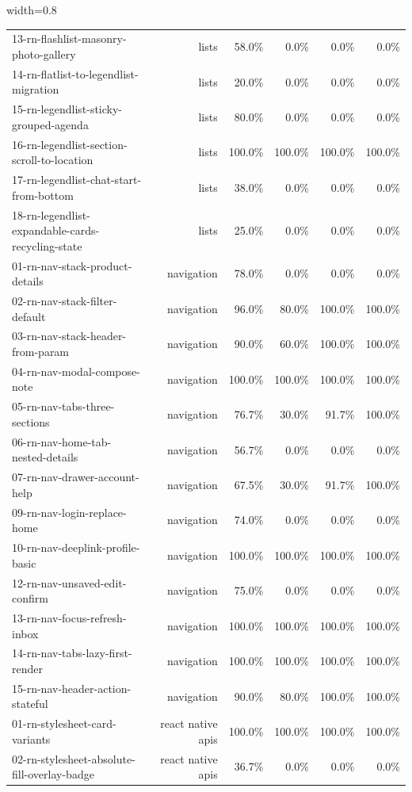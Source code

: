 \begin{table}[htbp]
\begin{adjustbox}{width=0.8\textwidth}
\begin{tabular}{lrrrrr}
13-rn-flashlist-masonry-photo-gallery & lists & 58.0\% & 0.0\% & 0.0\% & 0.0\% \\
14-rn-flatlist-to-legendlist-migration & lists & 20.0\% & 0.0\% & 0.0\% & 0.0\% \\
15-rn-legendlist-sticky-grouped-agenda & lists & 80.0\% & 0.0\% & 0.0\% & 0.0\% \\
16-rn-legendlist-section-scroll-to-location & lists & 100.0\% & 100.0\% & 100.0\% & 100.0\% \\
17-rn-legendlist-chat-start-from-bottom & lists & 38.0\% & 0.0\% & 0.0\% & 0.0\% \\
18-rn-legendlist-expandable-cards-recycling-state & lists & 25.0\% & 0.0\% & 0.0\% & 0.0\% \\
01-rn-nav-stack-product-details & navigation & 78.0\% & 0.0\% & 0.0\% & 0.0\% \\
02-rn-nav-stack-filter-default & navigation & 96.0\% & 80.0\% & 100.0\% & 100.0\% \\
03-rn-nav-stack-header-from-param & navigation & 90.0\% & 60.0\% & 100.0\% & 100.0\% \\
04-rn-nav-modal-compose-note & navigation & 100.0\% & 100.0\% & 100.0\% & 100.0\% \\
05-rn-nav-tabs-three-sections & navigation & 76.7\% & 30.0\% & 91.7\% & 100.0\% \\
06-rn-nav-home-tab-nested-details & navigation & 56.7\% & 0.0\% & 0.0\% & 0.0\% \\
07-rn-nav-drawer-account-help & navigation & 67.5\% & 30.0\% & 91.7\% & 100.0\% \\
09-rn-nav-login-replace-home & navigation & 74.0\% & 0.0\% & 0.0\% & 0.0\% \\
10-rn-nav-deeplink-profile-basic & navigation & 100.0\% & 100.0\% & 100.0\% & 100.0\% \\
12-rn-nav-unsaved-edit-confirm & navigation & 75.0\% & 0.0\% & 0.0\% & 0.0\% \\
13-rn-nav-focus-refresh-inbox & navigation & 100.0\% & 100.0\% & 100.0\% & 100.0\% \\
14-rn-nav-tabs-lazy-first-render & navigation & 100.0\% & 100.0\% & 100.0\% & 100.0\% \\
15-rn-nav-header-action-stateful & navigation & 90.0\% & 80.0\% & 100.0\% & 100.0\% \\
01-rn-stylesheet-card-variants & react native apis & 100.0\% & 100.0\% & 100.0\% & 100.0\% \\
02-rn-stylesheet-absolute-fill-overlay-badge & react native apis & 36.7\% & 0.0\% & 0.0\% & 0.0\% \\

\end{tabular}
\end{adjustbox}
\end{table}
